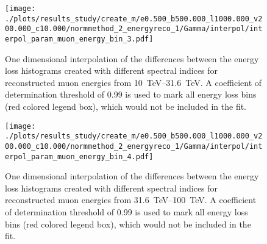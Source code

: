 \begin{figure}[H]
    \centering
    \texttt{[image: ./plots/results\_study/create\_m/e0.500\_b500.000\_l1000.000\_v200.000\_c10.000/normmethod\_2\_energyreco\_1/Gamma/interpol/interpol\_param\_muon\_energy\_bin\_3.pdf]}
    \caption{One dimensional interpolation of the differences between the energy loss histograms created with different spectral indices for reconstructed muon energies from \SIrange{10}{31.6}{TeV}. A coefficient of determination threshold of \num{0.99} is used to mark all energy loss bins (red colored legend box), which would not be included in the fit.}
    \label{fig:study_1d_interpol_mu3_nn_high_gamma}
\end{figure}

\begin{figure}[H]
    \centering
    \texttt{[image: ./plots/results\_study/create\_m/e0.500\_b500.000\_l1000.000\_v200.000\_c10.000/normmethod\_2\_energyreco\_1/Gamma/interpol/interpol\_param\_muon\_energy\_bin\_4.pdf]}
    \caption{One dimensional interpolation of the differences between the energy loss histograms created with different spectral indices for reconstructed muon energies from \SIrange{31.6}{100}{TeV}. A coefficient of determination threshold of \num{0.99} is used to mark all energy loss bins (red colored legend box), which would not be included in the fit.}
    \label{fig:study_1d_interpol_mu4_nn_high_gamma}
\end{figure}

%



